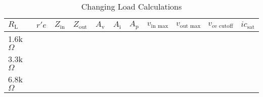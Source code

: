 \documentclass[main.tex]{subfiles}
\begin{document}
\begin{centering}
  \begin{table}[h]
    \caption{Changing Load Calculations}
    \begin{tabularx}{\textwidth}{|X|X|X|X|X|X|X|X|X|X|X|}
      \hline
      $R_{\text{L}}$ & $r'e$ & $Z_{\text{in}}$ & $Z_{\text{out}}$ & $A_{\text{v}}$ & $A_{\text{i}}$ & $A_{\text{p}}$ & $v_{\text{in max}}$ & $v_{\text{out max}}$ & $v_{\text{ce cutoff}}$ & $ic_{\text{sat}}$ \\
      \hline
      1.6k$\Omega$ & & & & & & & & & & \\
      \hline
      3.3k$\Omega$ & & & & & & & & & & \\
      \hline
      6.8k$\Omega$ & & & & & & & & & & \\
      \hline
    \end{tabularx}
  \end{table}
\end{centering}
\end{document}
